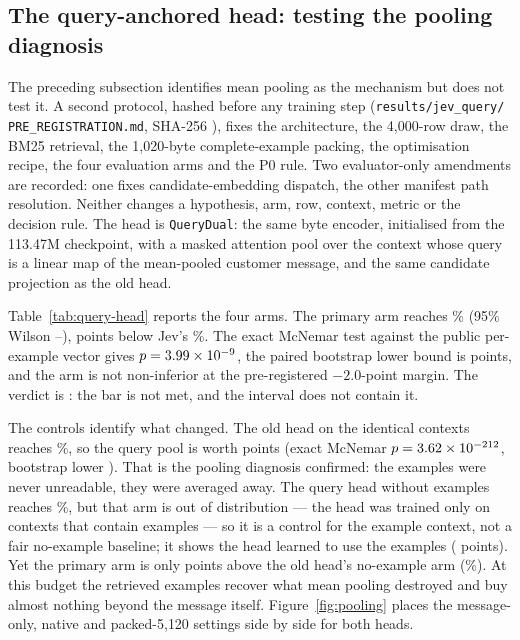 \subsection{The query-anchored head: testing the pooling diagnosis}
\label{sec:jev-query}

The preceding subsection identifies mean pooling as the mechanism but does not
test it. A second protocol, hashed before any training step
(\texttt{results/jev\_query/}\allowbreak
\texttt{PRE\_REGISTRATION.md}, SHA-256 \texttt{\QueryPrereg}), fixes the
architecture, the 4{,}000-row draw, the BM25
retrieval, the 1{,}020-byte complete-example packing, the optimisation recipe,
the four evaluation arms and the P0 rule. Two evaluator-only amendments are
recorded: one fixes candidate-embedding dispatch, the other manifest path
resolution. Neither changes a hypothesis, arm, row, context, metric or the
decision rule. The head is \texttt{QueryDual}: the same byte encoder,
initialised from the 113.47M checkpoint, with a masked attention pool over the
context whose query is a linear map of the mean-pooled customer message, and
the same candidate projection as the old head.

Table~\ref{tab:query-head} reports the four arms. The primary arm reaches
\QueryPctQueryTwo\% (95\% Wilson \QueryLoQueryTwo--\QueryHiQueryTwo),
\QueryDiffAbs{} points below Jev's
\QueryJevPct\%. The exact McNemar test against the public per-example vector
gives $p = 3.99\times10^{-9}$, the paired bootstrap lower bound is
\QueryLowerPrimary{} points, and the arm is not non-inferior at the
pre-registered $-2.0$-point margin. The verdict is \textbf{\QueryVerdict}: the
bar is not met, and the interval does not contain it.

The controls identify what changed. The old head on the identical contexts
reaches \QueryPctOldTwo\%, so the query pool is worth \QueryMechGain{} points
(exact McNemar $p = 3.62\times10^{-212}$, bootstrap lower \QueryMechLower). That is the
pooling diagnosis confirmed: the examples were never unreadable, they were
averaged away. The query head without examples reaches \QueryPctQueryZero\%, but
that arm is out of distribution --- the head was trained only on contexts that
contain examples --- so it is a control for the example context, not a
fair no-example baseline; it shows the head learned to use the examples
(\QueryVsZeroGain{} points). Yet the primary arm is only
\QueryVsOldZeroGain{} points above the old head's no-example arm
(\QueryPctOldZero\%). At this budget the retrieved examples recover what mean
pooling destroyed and buy almost nothing beyond the message itself.
Figure~\ref{fig:pooling} places the message-only, native and packed-5{,}120
settings side by side for both heads.

